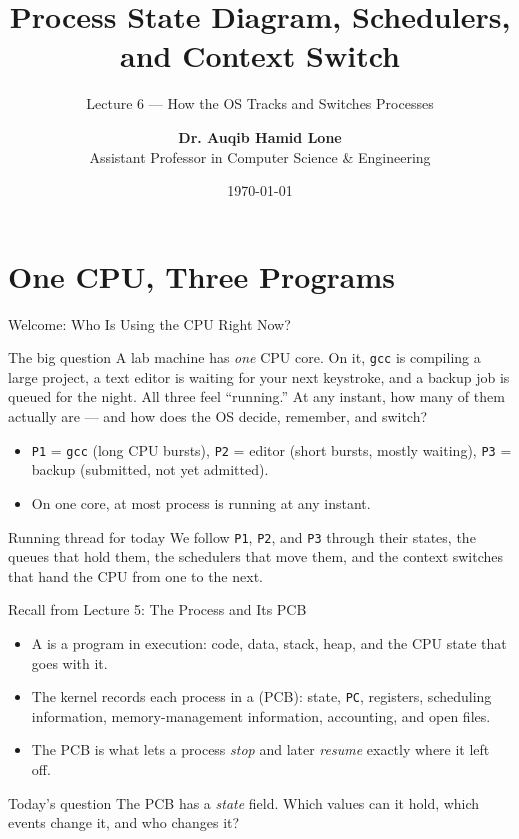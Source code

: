 \documentclass[aspectratio=169]{beamer}
\title{Process State Diagram, Schedulers, and Context Switch}
\subtitle{Lecture 6 --- How the OS Tracks and Switches Processes}
\author[Dr. Auqib Hamid Lone]{%
  \textbf{Dr. Auqib Hamid Lone}\\
  \small Assistant Professor in Computer Science \& Engineering
}
\institute[GCET Ganderbal]{%
  \small\textbf{PCC CS-502: Operating Systems}\\[0.3em]
  Department of Computer Science \& Engineering\\
  Government College of Engineering \& Technology (GCET), Ganderbal
}
\date[\today]{\small\today}
\begin{document}
\frame{\titlepage}

\section{One CPU, Three Programs}

\begin{frame}{Welcome: Who Is Using the CPU Right Now?}
  \begin{block}{The big question}
    A lab machine has \emph{one} CPU core. On it, \texttt{gcc} is compiling
    a large project, a text editor is waiting for your next keystroke, and a
    backup job is queued for the night. All three feel ``running.'' At any
    instant, how many of them actually are --- and how does the OS decide,
    remember, and switch?
  \end{block}
  \begin{itemize}
    \item \texttt{P1} = \texttt{gcc} (long CPU bursts), \texttt{P2} = editor
      (short bursts, mostly waiting), \texttt{P3} = backup (submitted, not yet
      admitted).
    \item On one core, at most  process is running at any instant.
  \end{itemize}
  \vspace{0.1cm}
  \begin{alertblock}{Running thread for today}
    We follow \texttt{P1}, \texttt{P2}, and \texttt{P3} through their states,
    the queues that hold them, the schedulers that move them, and the context
    switches that hand the CPU from one to the next.
  \end{alertblock}
\end{frame}

\begin{frame}{Recall from Lecture 5: The Process and Its PCB}
  \begin{itemize}
    \item A  is a program in execution: code, data, stack, heap,
      and the CPU state that goes with it.
    \item The kernel records each process in a 
      (PCB): state, \texttt{PC}, registers, scheduling information,
      memory-management information, accounting, and open files.
    \item The PCB is what lets a process \emph{stop} and later \emph{resume}
      exactly where it left off.
  \end{itemize}
  \vspace{0.2cm}
  \begin{block}{Today's question}
    The PCB has a \emph{state} field. Which values can it hold, which events
    change it, and who changes it?
  \end{block}
\end{frame}
\end{document}
